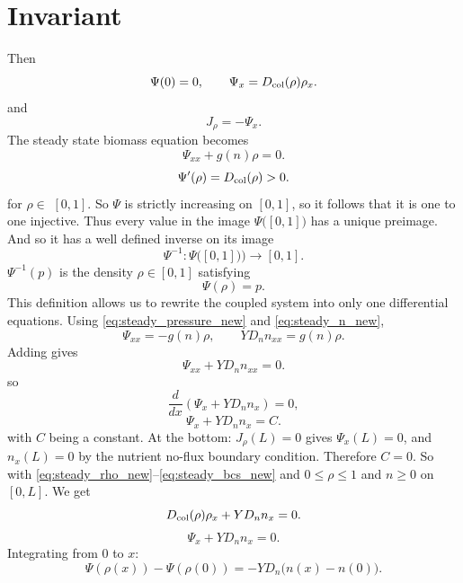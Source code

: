 \documentclass[11pt,a4paper]{report}
\begin{document}
\section{Invariant}
\label{invariant}
Then
\begin{equation}
	\Psi(0)=0,
	\qquad
	\Psi_x=D_{\rm col}(\rho)\rho_x.
\end{equation}
and
\begin{equation}
	J_\rho=-\Psi_x.
\end{equation}
The steady state biomass equation becomes
\begin{equation}
	{
		\Psi_{xx}+g(n)\rho=0.
	}
	\label{eq:steady_pressure_new}
\end{equation}
\[
\Psi'(\rho)=D_{\rm col}(\rho)>0.
\]
for $\rho \in$ $[0,1]$. So $\Psi$ is strictly increasing on $[0,1]$, so it follows that it is one to one injective. Thus every value in the image $\Psi\bigl([0,1])$ has a unique preimage. And so it
has a well defined inverse on its image
\[
\Psi^{-1}:\Psi\bigl([0,1])\bigr)\to[0,1].
\]
$\Psi^{-1}(p)$ is the density
$\rho\in[0,1]$ satisfying
\[
\Psi(\rho)=p.
\]
This definition allows us to rewrite the coupled system into only one differential equations.
Using \eqref{eq:steady_pressure_new} and \eqref{eq:steady_n_new},
\begin{equation}
	\Psi_{xx}=-g(n)\rho,
	\qquad
	YD_n n_{xx}=g(n)\rho.
\end{equation}
Adding gives
\begin{equation}
	\Psi_{xx}+YD_n n_{xx}=0.
\end{equation}
so
\begin{equation}
	\frac{d}{dx}\left(\Psi_x+YD_n n_x\right)=0,
\end{equation}		
\begin{equation}
	\Psi_x+YD_n n_x=C.
\end{equation}
with $C$ being a constant. At the bottom: $J_\rho(L)=0$ gives $\Psi_x(L)=0$, and $n_x(L)=0$ by the
nutrient no-flux boundary condition.  Therefore $C=0$.
So with \eqref{eq:steady_rho_new}--\eqref{eq:steady_bcs_new} and
$0\le \rho\le 1$ and $n\ge0$ on $[0,L]$. We get
\begin{equation}
	{
		D_{\rm col}(\rho)\rho_x+YD_n n_x=0.
	}
	\label{eq:flux_invariant_new}
\end{equation}	
\begin{equation}
	{
		\Psi_x+YD_n n_x=0.
	}
	\label{eq:Psi_invariant_new}
\end{equation}
Integrating from $0$ to $x$:
\begin{equation}
	\Psi(\rho(x))-\Psi(\rho(0))
	=-YD_n\bigl(n(x)-n(0)\bigr).
\end{equation}
\end{document}
